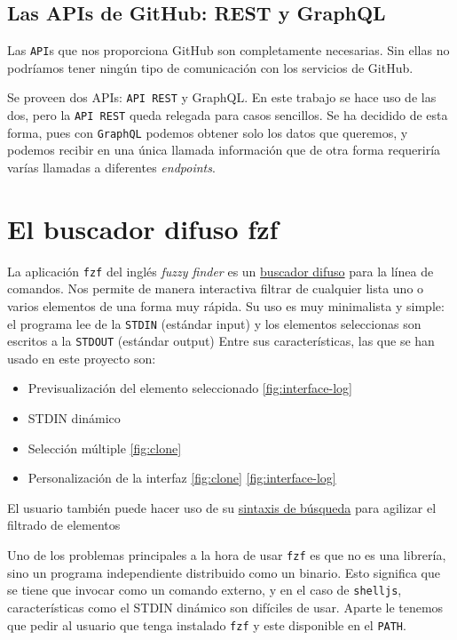 \subsection{Las APIs de GitHub: REST y  GraphQL}
Las \verb|API|s que nos proporciona GitHub son completamente necesarias. Sin ellas no podríamos tener ningún tipo de comunicación con los servicios de GitHub.

Se proveen dos APIs: \verb|API REST|\cite{github-rest-api} y GraphQL\cite{github-graphql}. En este trabajo se hace uso de las dos, pero la \verb|API REST| queda relegada para casos sencillos. Se ha decidido de esta forma, pues con \verb|GraphQL| podemos obtener solo los datos que queremos, y podemos recibir en una única llamada información que de otra forma requeriría varías llamadas a diferentes \emph{endpoints}.

\section{El buscador difuso fzf}
La aplicación \verb|fzf| \cite{fzf} del inglés \emph{fuzzy finder} es un \href{https://en.wikipedia.org/wiki/Approximate_string_matching}{buscador difuso} para la línea de comandos.
Nos permite de manera interactiva filtrar de cualquier lista uno o varios elementos de una forma muy rápida.
Su uso es muy minimalista y simple: el programa lee de la \verb|STDIN| (estándar input) y los elementos seleccionas son escritos a la \verb|STDOUT| (estándar output)
Entre sus características, las que se han usado en este proyecto son:
\begin{itemize}
    \item Previsualización del elemento seleccionado \ref{fig:interface-log}
    \item STDIN dinámico
    \item Selección múltiple \ref{fig:clone}
    \item Personalización de la interfaz \ref{fig:clone} \ref{fig:interface-log}
\end{itemize}
El usuario también puede hacer uso de su \href{https://github.com/junegunn/fzf#search-syntax}{sintaxis de búsqueda} para agilizar el filtrado de elementos

Uno de los problemas principales a la hora de usar \verb|fzf| es que no es una librería, sino un programa independiente distribuido como un binario. Esto significa que se tiene que invocar como un comando externo, y en el caso de \verb|shelljs|, características como el STDIN dinámico son difíciles de usar. Aparte le tenemos que pedir al usuario que tenga instalado \verb|fzf| y este disponible en el \verb|PATH|.

